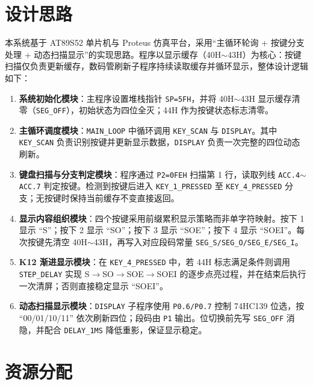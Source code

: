 \documentclass[12pt,a4paper]{article}
\begin{document}
\section{设计思路}
本系统基于 AT89S52 单片机与 Proteus 仿真平台，采用“主循环轮询 + 按键分支处理 + 动态扫描显示”的实现思路。程序以显示缓存（40H$\sim$43H）为核心：按键扫描仅负责更新缓存，数码管刷新子程序持续读取缓存并循环显示，整体设计逻辑如下：
\begin{enumerate}
    \item \textbf{系统初始化模块}：主程序设置堆栈指针 \texttt{SP=5FH}，并将 40H$\sim$43H 显示缓存清零（\texttt{SEG\_OFF}），初始状态为四位全灭；44H 作为按键状态标志清零。
    \item \textbf{主循环调度模块}：\texttt{MAIN\_LOOP} 中循环调用 \texttt{KEY\_SCAN} 与 \texttt{DISPLAY}。其中 \texttt{KEY\_SCAN} 负责识别按键并更新显示数据，\texttt{DISPLAY} 负责一次完整的四位动态刷新。
    \item \textbf{键盘扫描与分支判定模块}：程序通过 \texttt{P2=0FEH} 扫描第 1 行，读取列线 \texttt{ACC.4$\sim$ACC.7} 判定按键。检测到按键后进入 \texttt{KEY\_1\_PRESSED} 至 \texttt{KEY\_4\_PRESSED} 分支；无按键时保持当前缓存不变直接返回。
    \item \textbf{显示内容组织模块}：四个按键采用前缀累积显示策略而非单字符映射。按下 1 显示 ``S''；按下 2 显示 ``SO''；按下 3 显示 ``SOE''；按下 4 显示 ``SOEI''。每次按键先清空 40H$\sim$43H，再写入对应段码常量 \texttt{SEG\_S/SEG\_O/SEG\_E/SEG\_I}。
    \item \textbf{K12 渐进显示模块}：在 \texttt{KEY\_4\_PRESSED} 中，若 44H 标志满足条件则调用 \texttt{STEP\_DELAY} 实现 S$\rightarrow$SO$\rightarrow$SOE$\rightarrow$SOEI 的逐步点亮过程，并在结束后执行一次清屏；否则直接稳定显示 ``SOEI''。
    \item \textbf{动态扫描显示模块}：\texttt{DISPLAY} 子程序使用 \texttt{P0.6/P0.7} 控制 74HC139 位选，按 ``00/01/10/11'' 依次刷新四位；段码由 \texttt{P1} 输出。位切换前先写 \texttt{SEG\_OFF} 消隐，并配合 \texttt{DELAY\_1MS} 降低重影，保证显示稳定。
\end{enumerate}

\section{资源分配}
\end{document}
